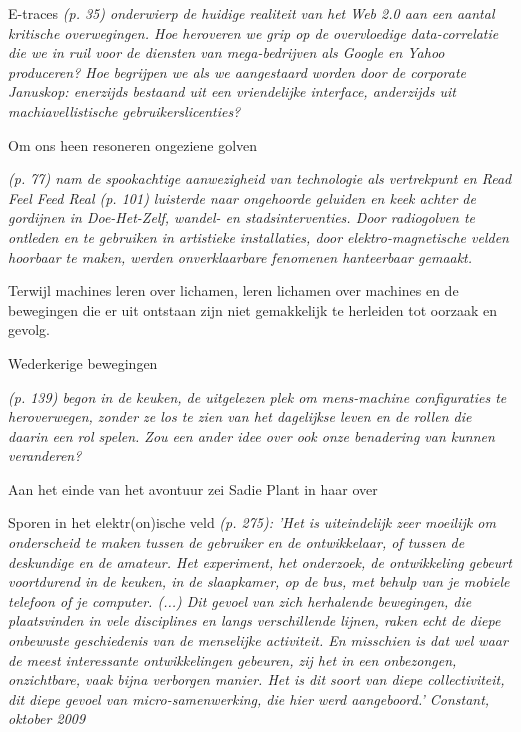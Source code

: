 {{E-traces {\em (p. 35) onderwierp de huidige realiteit van het Web 2.0 aan een aantal kritische overwegingen. Hoe heroveren we grip op de overvloedige data-correlatie die we in ruil voor de diensten van mega-bedrijven als Google en Yahoo produceren? Hoe begrijpen we  als we aangestaard worden door de corporate Januskop: enerzijds bestaand uit een vriendelijke interface, anderzijds uit machiavellistische gebruikerslicenties? } 

Om ons heen resoneren ongeziene golven {\em (p. 77) nam de spookachtige aanwezigheid van technologie als vertrekpunt en {\em Read Feel Feed Real} (p. 101) luisterde naar ongehoorde geluiden en keek achter de gordijnen in Doe-Het-Zelf, wandel- en stadsinterventies. Door radiogolven te ontleden en te gebruiken in artistieke installaties, door elektro-magnetische velden hoorbaar te maken, werden onverklaarbare fenomenen hanteerbaar gemaakt.

Terwijl machines leren over lichamen, leren lichamen over machines en de bewegingen die er uit ontstaan zijn niet gemakkelijk te herleiden tot oorzaak en gevolg.} Wederkerige bewegingen {\em (p. 139) begon in de keuken, de uitgelezen plek om mens-machine configuraties te heroverwegen, zonder ze los te zien van het dagelijkse leven en de rollen die daarin een rol spelen. Zou een ander idee over  ook onze benadering van  kunnen veranderen?

Aan het einde van het avontuur zei Sadie Plant in haar  over} Sporen in het elektr(on)ische veld {\em (p. 275): 'Het is uiteindelijk zeer moeilijk om onderscheid te maken tussen de gebruiker en de ontwikkelaar, of tussen de deskundige en de amateur. Het experiment, het onderzoek, de ontwikkeling gebeurt voortdurend in de keuken, in de slaapkamer, op de bus, met behulp van je mobiele telefoon of je computer. (...) Dit gevoel van zich herhalende bewegingen, die plaatsvinden in vele disciplines en langs verschillende lijnen, raken echt de diepe onbewuste geschiedenis van de menselijke activiteit. En misschien is dat wel waar de meest interessante ontwikkelingen gebeuren, zij het in een onbezongen, onzichtbare, vaak bijna verborgen manier. Het is dit soort van diepe collectiviteit, dit diepe gevoel van micro-samenwerking, die hier werd aangeboord.'
\blank
Constant, oktober 2009}

}

\page

}
